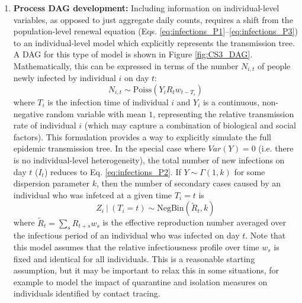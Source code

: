 \documentclass{article}
\begin{document}
\begin{enumerate}
    \item \textbf{Process DAG development:} Including information on individual-level variables, as opposed to just aggregate daily counts, requires a shift from the population-level renewal equation (Eqs. \eqref{eq:infections_P1}--\eqref{eq:infections_P3}) to an individual-level model which explicitly represents the transmission tree. A DAG for this type of model is shown in Figure \ref{fig:CS3_DAG}. Mathematically, this can be expressed in terms of the number $N_{i,t}$ of people newly infected by individual $i$ on day $t$:
    \begin{equation} \label{eq:individual_level}
    N_{i,t} \sim \mathrm{Poiss} \left( Y_i R_t w_{t-T_i} \right)
    \end{equation}
    where $T_i$ is the infection time of individual $i$ and $Y_i$ is a continuous, non-negative random variable with mean $1$, representing the relative transmission rate of individual $i$ (which may capture a combination of biological and social factors). This formulation provides a way to explicitly simulate the full epidemic transmission tree.  In the special case where $Var(Y)=0$ (i.e. there is no individual-level heterogeneity), the total number of new infections on day $t$ ($I_t$) reduces to Eq. \eqref{eq:infections_P2}. 
    If $Y\sim \Gamma(1,k)$ for some dispersion parameter $k$, then the number of secondary cases caused by an individual who was infetced at a given time $T_i=t$ is \citep{lloyd2005superspreading}
     \begin{equation} \label{eq:offspring_dist}
        Z_i \ | \ (T_i=t) \sim \mathrm{NegBin}\left( \tilde{R}_{t}, k\right)
    \end{equation}   
    where $\tilde{R}_t= \sum_s R_{t+s} w_s$ is the effective reproduction number averaged over the infectious period of an individual who was infected on day $t$.
    Note that this model assumes that the relative infectiousness profile over time $w_s$ is fixed and identical for all individuals. This is a reasonable starting assumption, but it may be important to relax this in some situations, for example to model the impact of quarantine and isolation measures on individuals identified by contact tracing.

\end{enumerate}
\end{document}
